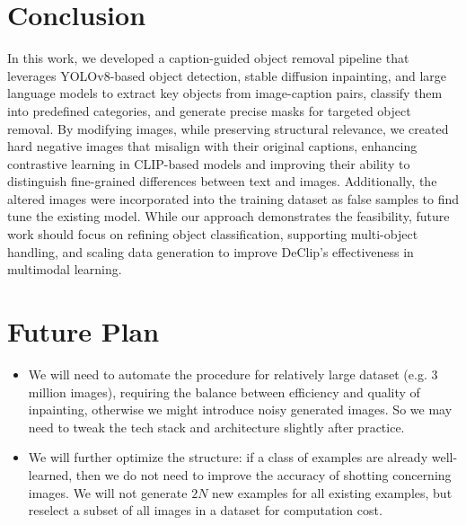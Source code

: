 \documentclass[11pt,letterpaper]{article}
\begin{document}
\section{Conclusion}
In this work, we developed a caption-guided object removal pipeline that leverages YOLOv8-based object detection, stable diffusion inpainting, and large language models to extract key objects from image-caption pairs, classify them into predefined categories, and generate precise masks for targeted object removal. By modifying images, while preserving structural relevance, we created hard negative images that misalign with their original captions, enhancing contrastive learning in CLIP-based models and improving their ability to distinguish fine-grained differences between text and images. Additionally, the altered images were incorporated into the training dataset as false samples to find tune the existing model. While our approach demonstrates the feasibility, future work should focus on refining object classification, supporting multi-object handling, and scaling data generation to improve DeClip’s effectiveness in multimodal learning.

\section{Future Plan}
\begin{itemize}
    \item We will need to automate the procedure for relatively large dataset (e.g. 3 million images), requiring the balance between efficiency and quality of inpainting, otherwise we might introduce noisy generated images. So we may need to tweak the tech stack and architecture slightly after practice.
    \item We will further optimize the structure: if a class of examples are already well-learned, then we do not need to improve the accuracy of shotting concerning images. We will not generate $2N$ new examples for all existing examples, but reselect a subset of all images in a dataset for computation cost.
\end{itemize}
\end{document}
